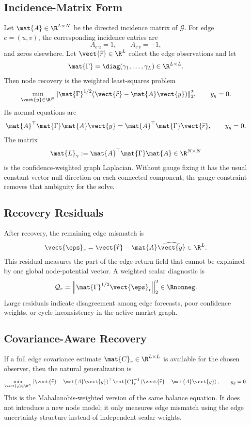 \subsection{Incidence-Matrix Form}
\label{subsec:incidence-matrix-form}

Let $\mat{A}\in\R^{L\times N}$ be the directed incidence matrix of
$\mathcal{G}$.  For edge $e=(u,v)$, the corresponding incidence entries are
\[
  A_{e\,u}=1,
  \qquad
  A_{e\,v}=-1,
\]
and zeros elsewhere.  Let $\vect{\widehat{r}}\in\R^L$ collect the edge
observations and let
\[
  \mat{\Gamma}
  =
  \diag(\gamma_1,\ldots,\gamma_L)
  \in\R^{L\times L}.
\]
Then node recovery is the weighted least-squares problem
\[
  \min_{\vect{y}\in\R^N}
  \lVert
    \mat{\Gamma}^{1/2}
    (\vect{\widehat{r}}-\mat{A}\vect{y})
  \rVert_2^2,
  \qquad
  y_g=0.
\]
Its normal equations are
\[
  \mat{A}^{\top}\mat{\Gamma}\mat{A}\vect{y}
  =
  \mat{A}^{\top}\mat{\Gamma}\vect{\widehat{r}},
  \qquad
  y_g=0.
\]
The matrix
\[
  \mat{L}_{\gamma}
  :=
  \mat{A}^{\top}\mat{\Gamma}\mat{A}
  \in\R^{N\times N}
\]
is the confidence-weighted graph Laplacian.  Without gauge fixing it has the
usual constant-vector null direction on each connected component; the gauge
constraint removes that ambiguity for the solve.

\subsection{Recovery Residuals}
\label{subsec:recovery-residuals}

After recovery, the remaining edge mismatch is
\[
  \vect{\eps}_r
  =
  \vect{\widehat{r}}
  -
  \mat{A}\widehat{\vect{y}}
  \in\R^L.
\]
This residual measures the part of the edge-return field that cannot be
explained by one global node-potential vector.  A weighted scalar diagnostic is
\[
  \mathcal{Q}_r
  =
  \left\|
    \mat{\Gamma}^{1/2}\vect{\eps}_r
  \right\|_2^2
  \in\Rnonneg.
\]
Large residuals indicate disagreement among edge forecasts, poor confidence
weights, or cycle inconsistency in the active market graph.

\subsection{Covariance-Aware Recovery}
\label{subsec:covariance-aware-recovery}

If a full edge covariance estimate $\mat{C}_r\in\R^{L\times L}$ is available for
the chosen observer, then the natural generalization is
\[
  \min_{\vect{y}\in\R^N}
  \left(
    \vect{\widehat{r}}-\mat{A}\vect{y}
  \right)^{\top}
  \mat{C}_r^{-1}
  \left(
    \vect{\widehat{r}}-\mat{A}\vect{y}
  \right),
  \qquad
  y_g=0.
\]
This is the Mahalanobis-weighted version of the same balance equation.  It does
not introduce a new node model; it only measures edge mismatch using the edge
uncertainty structure instead of independent scalar weights.

